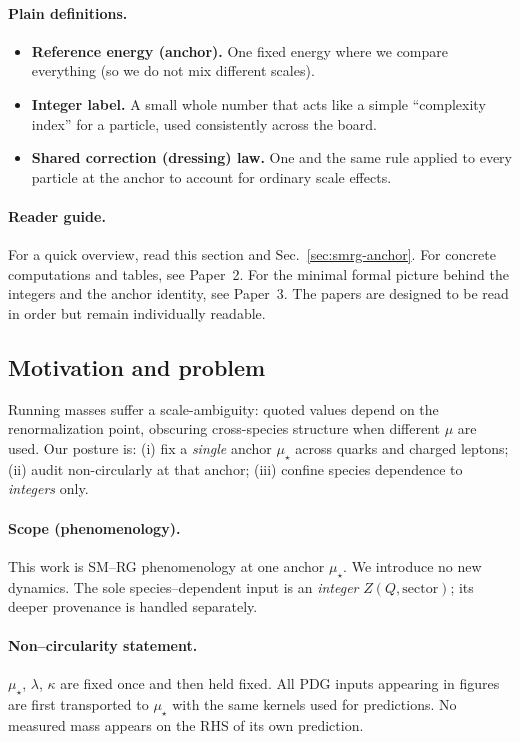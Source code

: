 \documentclass[epjc3]{svjour3}
\begin{document}
\paragraph{Plain definitions.}
\begin{itemize}
  \item \textbf{Reference energy (anchor).} One fixed energy where we compare everything (so we do not mix different scales).
  \item \textbf{Integer label.} A small whole number that acts like a simple “complexity index” for a particle, used consistently across the board.
  \item \textbf{Shared correction (dressing) law.} One and the same rule applied to every particle at the anchor to account for ordinary scale effects.
\end{itemize}

\paragraph{Reader guide.}
For a quick overview, read this section and Sec.~\ref{sec:smrg-anchor}. For concrete computations and tables, see Paper~2. For the minimal formal picture behind the integers and the anchor identity, see Paper~3. The papers are designed to be read in order but remain individually readable.



\subsection{Motivation and problem}
Running masses suffer a scale-ambiguity: quoted values depend on the renormalization point, obscuring cross-species structure when different $\mu$ are used. Our posture is: (i) fix a \emph{single} anchor $\mu_\star$ across quarks and charged leptons; (ii) audit non-circularly at that anchor; (iii) confine species dependence to \emph{integers} only.

\paragraph{Scope (phenomenology).}
This work is SM–RG phenomenology at one anchor $\mu_\star$. We introduce no new dynamics. The sole species–dependent input is an \emph{integer} $Z(Q,\text{sector})$; its deeper provenance is handled separately.

\paragraph{Non–circularity statement.}
$\mu_\star$, $\lambda$, $\kappa$ are fixed once and then held fixed. All PDG inputs appearing in figures are first transported to $\mu_\star$ with the same kernels used for predictions. No measured mass appears on the RHS of its own prediction.
\end{document}
